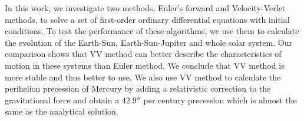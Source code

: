 In this work, we investigate two methods, Euler's forward and Velocity-Verlet methods, 
to solve a set of first-order ordinary differential equations with initial conditions. 
To test the performance of these algorithms, 
we use them to calculate the evolution of the Earth-Sun, Earth-Sun-Jupiter and whole solar system. 
Our comparison shows that VV method can better describe the characteristics of motion in these systems than Euler method. 
We conclude that VV method is more stable and thus better to use. 
We also use VV method to calculate the perihelion precession of Mercury by adding a relativistic correction to the gravitational force 
and obtain a $42.9''$ per century precession which is almost the same as the analytical solution. 